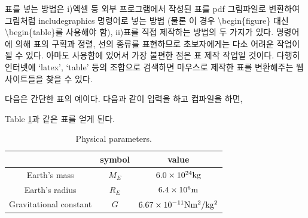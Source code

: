 \documentclass[twoside,11pt]{gshs_thesis}
\begin{document}
 표를 넣는 방법은 i)엑셀 등 외부 프로그램에서 작성된 표를 pdf 그림파일로 변환하여 그림처럼 includegraphics 명령어로 넣는 방법 (물론 이 경우 {\textbackslash}begin\{figure\} 대신 {\textbackslash}begin\{table\}를 사용해야 함), ii) 표를 직접 제작하는 방법의 두 가지가 있다.  명령어에 의해 표의 구획과 정렬, 선의 종류를 표현하므로 초보자에게는 다소 어려운 작업이 될 수 있다. 아마도  사용함에 있어서 가장 불편한 점은 표 제작 작업일 것이다. 다행히 인터넷에 `latex', `table' 등의 조합으로 검색하면 마우스로 제작한 표를  변환해주는 웹사이트들을 찾을 수 있다.

다음은 간단한 표의 예이다. 다음과 같이 입력을 하고 컴파일을 하면,
\begin{center}
\end{center}
Table \ref{table01}과 같은 표를 얻게 된다.
\begin{table}[t]
\caption{Physical parameters.} \label{table01}
\begin{center}
\begin{tabular}{c|c|c}
\hline
 & symbol & value \\ \hline
Earth's mass & $M_E$ & $6.0\times 10^{24} {\rm kg}$ \\
Earth's radius & $R_E$ & $6.4\times 10^6 {\rm m}$ \\
Gravitational constant & $G$ & $6.67\times 10^{-11} {\rm N m^2 /kg^2}$ \\ \hline
\end{tabular}
\end{center}
\end{table}
\end{document}
